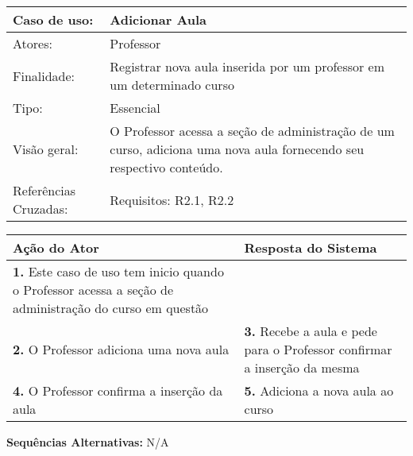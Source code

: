\documentclass[12pt,a4paper,onecolumn,titlepage]{article}
\begin{document}
\begin{table}[h!]
\begin{center}
\begin{tabular}{p{2.5cm} p{9.5cm}}
Caso de uso: & \textbf{Adicionar Aula} \\ \hline
Atores: & Professor \\ \hline
Finalidade: & Registrar nova aula inserida por um professor em um determinado curso\\ \hline
Tipo: & Essencial \\ \hline
Visão geral: & O Professor acessa a seção de administração de um curso, adiciona uma nova aula fornecendo seu respectivo conteúdo. \\ \hline
Referências Cruzadas: & Requisitos: R2.1, R2.2\\

\end{tabular}
\end{center}
\end{table} 

\begin{center}
\def\arraystretch{1.1}
\begin{tabular}{|p{6cm}|p{6cm}|}

\hline
\textbf{Ação do Ator} & \textbf{Resposta do Sistema} \\ \hline
\textbf{1.} Este caso de uso tem inicio quando o Professor acessa a seção de administração do curso em questão  & \\ \hline
\textbf{2.} O Professor adiciona uma nova aula  & \textbf{3.} Recebe a aula e pede para o Professor confirmar a inserção da mesma  \\ \hline
\textbf{4.} O Professor confirma a inserção da aula  & \textbf{5.} Adiciona a nova aula ao curso\\ \hline
\end{tabular}
\end{center}

\textbf{Sequências Alternativas:} N/A

\newpage
\end{document}
